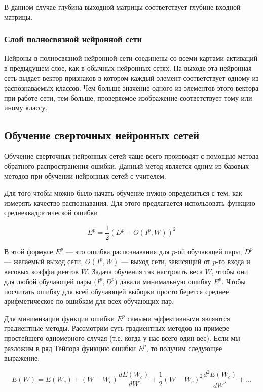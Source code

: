 \documentclass[14pt]{article}
\numberwithin{figure}{section}
\numberwithin{equation}{section}
\begin{document}
В данном случае глубина выходной матрицы соответствует глубине входной матрицы.

\subsubsection{Слой полносвязной нейронной сети}

Нейроны в полносвязной нейронной сети соединены со всеми картами активаций в предыдущем слое, как в обычных нейронных сетях. На выходе эта нейронная сеть выдает вектор признаков в котором каждый элемент соответствует одному из распознаваемых классов. Чем больше значение одного из элементов этого вектора при работе сети, тем больше, проверяемое изображение соответствует тому или иному классу.

\newpage

\subsection{Обучение сверточных нейронных сетей}

Обучение сверточных нейронных сетей чаще всего производят с помощью метода обратного распространения ошибки. Данный метод является одним из базовых методов при обучении нейронных сетей с учителем.

Для того чтобы можно было начать обучение нужно определиться с тем, как измерять качество распознавания. Для этого предлагается использовать функцию среднеквадратической ошибки \cite{LeCunBackProb}

\begin{equation}
	E^p = \frac{1}{2}(D^p - O(I^p, W))^2
\end{equation}

В этой формуле $E^p$ — это ошибка распознавания для $p$-ой обучающей пары, $D^p$ — желаемый выход сети, $O(I^p,W)$ — выход сети, зависящий от $p$-го входа и весовых коэффициентов $W$. Задача обучения так настроить веса $W$, чтобы они для любой обучающей пары $(I^p,D^p$) давали минимальную ошибку $E^p$. Чтобы посчитать ошибку для всей обучающей выборки просто берется среднее арифметическое по ошибкам для всех обучающих пар.

Для минимизации функции ошибки $E^p$ самыми эффективными являются градиентные методы. Рассмотрим суть градиентных методов на примере простейшего одномерного случая (т.е. когда у нас всего один вес). Если мы разложим в ряд Тейлора функцию ошибки $E^p$, то получим следующее выражение:

\begin{equation}
	E(W) = E(W_c) + (W - W_c)\frac{dE(W_c)}{dW} + \frac{1}{2} (W - W_c)^2 \frac{d^2E(W_c)}{dW^2} + \ldots
\end{equation}
\end{document}

